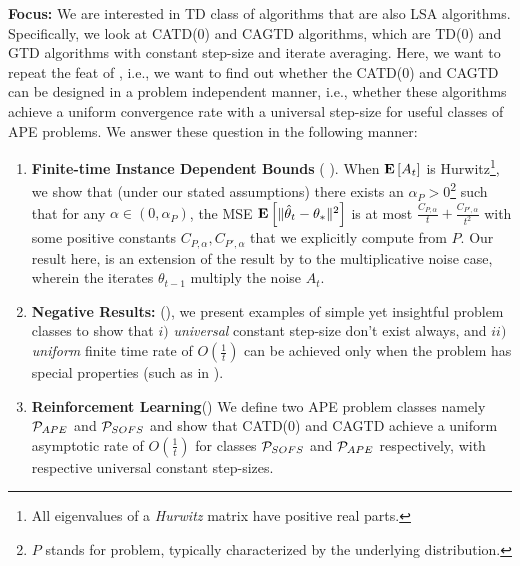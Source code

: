 \textbf{Focus:} We are interested in TD class of algorithms that are also LSA algorithms. Specifically, we look at CATD(0) and CAGTD algorithms, which are TD(0) and GTD algorithms with constant step-size and iterate averaging. Here, we want to repeat the feat of \cite{bach}, i.e., we want to find out whether the CATD(0) and CAGTD can be designed in a problem independent manner, i.e., whether these algorithms achieve a uniform convergence rate with a universal step-size for useful classes of APE problems. We answer these question in the following manner:
\begin{enumerate}[leftmargin=*]%
\item \textbf{Finite-time Instance Dependent Bounds} ( ). When $\EE{A_t}$ is Hurwitz\footnote{All eigenvalues of a  \emph{Hurwitz} matrix have positive real parts.}, we show that (under our stated assumptions) there exists an $\alpha_P>0$\footnote{$P$ stands for problem, typically characterized by the underlying distribution.} such that for any $\alpha\in (0,\alpha_P)$,
the MSE $\EE{\normsm{\thh_t-\ts}^2}$
is at most $\frac{C_{P,\alpha}}{t}+\frac{C_{P',\alpha}}{t^2}$ with some positive constants $C_{P,\alpha},C_{P',\alpha}$ that we explicitly compute from $P$.
Our result here, is an extension of the result by \citet{polyal-judisky} to the multiplicative noise case, wherein the iterates $\theta_{t-1}$ multiply the noise $A_t$.

\item \textbf{Negative Results:} (), we present examples of simple yet insightful problem classes to show that $i)$ \emph{universal} constant step-size don't exist always, and $ii)$ \emph{uniform} finite time rate of $O(\frac{1}{t})$ can be achieved only when the problem has special properties (such as in \cite{bach}). 
\item \textbf{Reinforcement Learning}() We define two APE problem classes namely $\P_{APE}$ and $\P_{SOFS}$ and show that CATD(0) and CAGTD achieve a uniform asymptotic rate of $O(\frac{1}{t})$ for classes $\P_{SOFS}$ and $\P_{APE}$ respectively, with respective universal constant step-sizes.
\end{enumerate}%
